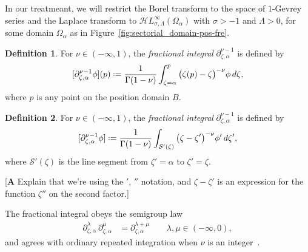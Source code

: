 \documentclass{article}
\newcommand{\singexp}[2]{\mathcal{H}L^\infty_{#1, #2}}
\newcommand{\fracderiv}[3]{\partial^{#1}_{#2, #3}}
\newcommand*{\defeq}{\mathrel{\vcenter{\baselineskip0.5ex \lineskiplimit0pt
                     \hbox{\scriptsize.}\hbox{\scriptsize.}}}%
                     =}
\theoremstyle{definition}
\newtheorem{definition}{Definition}[section]
\theoremstyle{plain}
\newenvironment{todo}{\color{Coral}}{\color{black}}
\newenvironment{old}{\color{RoyalBlue}}{\color{black}}
\begin{document}
In our treatmeant, we will restrict the Borel transform to the space of $1$-Gevrey series and the Laplace transform to $\singexp{\sigma}{\Lambda}(\Omega_\alpha)$ with $\sigma>-1$ and $\Lambda>0$, for some domain $\Omega_\alpha$ as in Figure~\ref{fig:sectorial_domain-pos-fre}. 
\begin{old}
\begin{definition}
For $\nu \in (-\infty, 1)$, the \textit{fractional integral} $\partial^{\nu-1}_{\zeta, \alpha}$ is defined by
\[ [\partial^{\nu-1}_{\zeta, \alpha} \phi](p) \defeq \frac{1}{\Gamma(1-\nu)} \int_{\zeta =\alpha}^p \big(\zeta(p)-\zeta\big)^{-\nu} \phi\,d\zeta, \]
where $p$ is any point on the position domain $B$.
\end{definition}
\end{old}
\begin{definition}
For $\nu \in (-\infty, 1)$, the \textit{fractional integral} $\partial^{\nu-1}_{\zeta, \alpha}$ is defined by
\[ [\partial^{\nu-1}_{\zeta, \alpha} \phi] \defeq \frac{1}{\Gamma(1-\nu)} \int_{\mathcal{S}'(\zeta)} \big(\zeta-\zeta'\big)^{-\nu} \phi' \,d\zeta', \]
where $\mathcal{S}'(\zeta)$ is the line segment from $\zeta'=\alpha$ to $\zeta'=\zeta$.%
\end{definition}
\begin{todo}[\textbf{A} Explain that we're using the $'$, $''$ notation, and $\zeta - \zeta'$ is an expression for the function $\zeta''$ on the second factor.]\end{todo}

The fractional integral obeys the semigroup law \cite[Section  1.3]{mladenov2014advanced}
\begin{align*}
\fracderiv{\lambda}{\zeta}{\alpha}\,\fracderiv{\mu}{\zeta}{\alpha} & = \fracderiv{\lambda+\mu}{\zeta}{\alpha} \qquad \lambda, \mu \in (-\infty, 0),
\end{align*}
and agrees with ordinary repeated integration when $\nu$ is an integer~\cite[Equation 35]{mladenov2014advanced}.
\end{document}
